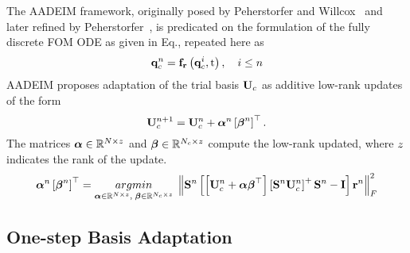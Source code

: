 The AADEIM framework, originally posed by Peherstorfer and Willcox~\cite{Peherstorfer2015} and later refined by Peherstorfer~\cite{Peherstorfer2020Adaptive,Peherstorfer2022}, is predicated on the formulation of the fully discrete FOM ODE as given in Eq., repeated here as
%
\begin{equation}
	\mathbf{q}_{c}^{n} = \mathbf{f}_{\mathbf{r}}\left(\mathbf{q}_{c}^{i}, \text{t}\right), \quad i \leq n
\end{equation}
%
AADEIM proposes adaptation of the trial basis $\consTrial$ as additive low-rank updates of the form
%
\begin{equation}
	\consTrial^{\timeIdx+1} = \consTrial^{\timeIdx} + \adeimAlpha^{\timeIdx} \left[\adeimBeta^{\timeIdx}\right]^\top.
\end{equation}
%
The matrices $\boldsymbol{\alpha} \in \mathbb{R}^{N \times z}$ and $\boldsymbol{\beta} \in \mathbb{R}^{N_c \times z}$ compute the low-rank updated, where $z$ indicates the rank of the update.
%
\begin{equation}
	\adeimAlpha^{\timeIdx} \left[\adeimBeta^{\timeIdx}\right]^\top = \argmin{\adeimAlpha \inRTwo{\numDOF}{\numRank},\; \adeimBeta \inRTwo{\numConsModes}{\numRank}} \left\Vert \sampMat^{\timeIdx} \left[\left[\consTrial^{\timeIdx} + \adeimAlpha \adeimBeta^\top \right] \left[\sampMat^{\timeIdx} \consTrial^{\timeIdx}\right]^+ \sampMat^{\timeIdx} - \identMat \right] \resWindow^{\timeIdx} \right\Vert_F^2
\end{equation}
%

\subsection{One-step Basis Adaptation}

